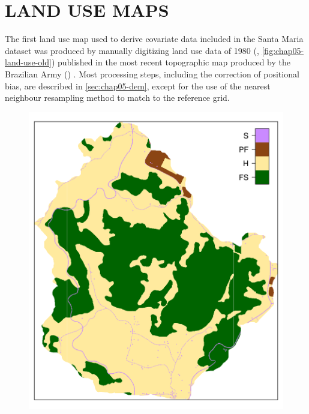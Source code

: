 \section{LAND USE MAPS}
\label{sec:chap05-land-use}

The first land use map used to derive covariate data included in the Santa Maria dataset was produced by 
manually digitizing land use data of \num{1980} (\landOld{}, \autoref{fig:chap05-land-use-old}) published in 
the most recent topographic map produced by the Brazilian Army () \cite{DSG1992a, DSG1992}. Most 
processing steps, including the correction of positional bias, are described in \autoref{sec:chap05-dem}, 
except for the use of the nearest neighbour resampling method to match \landOld{} to the reference grid.

\begin{figure}[!ht]
\centering
\begin{minipage}[b]{0.45\textwidth}
\subcaption{}
\label{fig:chap05-land-use-old}
\centering
\includegraphics[width = \textwidth]{fig/chap05-land-old}
\end{minipage}
\begin{minipage}[b]{0.45\textwidth}

\end{minipage}
\end{figure}
